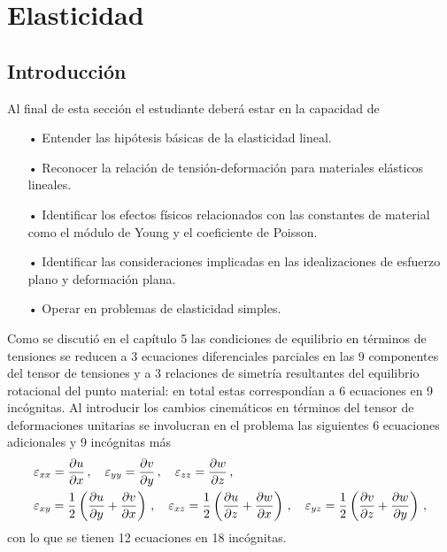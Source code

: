 \documentclass[../notas medios.tex]{subfiles}
\begin{document}
\chapter{Elasticidad}


\graphicspath{{img/Cap6/}}
\section{Introducción}

Al final de esta sección el estudiante deberá estar en la capacidad de
\begin{itemize}
\item[•] Entender las hipótesis básicas de la elasticidad lineal.
\item[•] Reconocer la relación de tensión-deformación para materiales elásticos lineales.
\item[•] Identificar los efectos físicos relacionados con las constantes de material como el módulo de Young y el coeficiente de Poisson.
\item[•] Identificar las consideraciones implicadas en las idealizaciones de esfuerzo plano y deformación plana.
\item[•] Operar en problemas de elasticidad simples.
\end{itemize}

Como se discutió en el capítulo 5 las condiciones de equilibrio en términos de 
tensiones se reducen a 3 ecuaciones diferenciales parciales en las 9
componentes del tensor de tensiones y a 3 relaciones de simetría resultantes 
del equilibrio rotacional del punto material: en total estas correspondían a 6 
ecuaciones en 9 incógnitas. Al introducir los cambios cinemáticos en términos 
del tensor de deformaciones unitarias se involucran en el problema las 
siguientes 6 ecuaciones adicionales y 9 incógnitas más
\begin{align*}
&\varepsilon_{xx} = \pdv{u}{x}\, ,\quad
\varepsilon_{yy} = \pdv{v}{y}\, ,\quad
\varepsilon_{zz} = \pdv{w}{z}\, ,\\
&\varepsilon_{xy} = \frac{1}{2}\left(\pdv{u}{y} + \pdv{v}{x}\right)\, ,\quad
\varepsilon_{xz} = \frac{1}{2}\left(\pdv{u}{z} + \pdv{w}{x}\right)\, ,\quad
\varepsilon_{yz} = \frac{1}{2}\left(\pdv{v}{z} + \pdv{w}{y}\right)\, ,
\end{align*}
con lo que se tienen 12 ecuaciones en 18 incógnitas.
\end{document}
